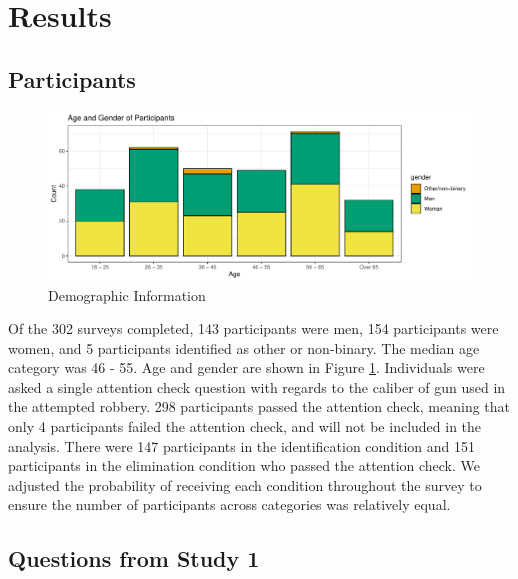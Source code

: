 \documentclass[print]{nuthesis}
\begin{document}
\hypertarget{results-1}{%
\section{Results}\label{results-1}}

\hypertarget{participants-1}{%
\subsection{Participants}\label{participants-1}}

\begin{figure}

{\centering \includegraphics[width=\linewidth]{thesis_files/figure-latex/demographics2-1} 

}

\caption{Demographic Information}\label{fig:demographics2}
\end{figure}

Of the 302 surveys completed, 143 participants were men, 154 participants were women, and 5 participants identified as other or non-binary.
The median age category was 46 - 55.
Age and gender are shown in Figure \ref{fig:demographics2}.
Individuals were asked a single attention check question with regards to the caliber of gun used in the attempted robbery.
298 participants passed the attention check, meaning that only 4 participants failed the attention check, and will not be included in the analysis.
There were 147 participants in the identification condition and 151 participants in the elimination condition who passed the attention check.
We adjusted the probability of receiving each condition throughout the survey to ensure the number of participants across categories was relatively equal.

\hypertarget{questions-from-study-1}{%
\subsection{Questions from Study 1}\label{questions-from-study-1}}
\end{document}
